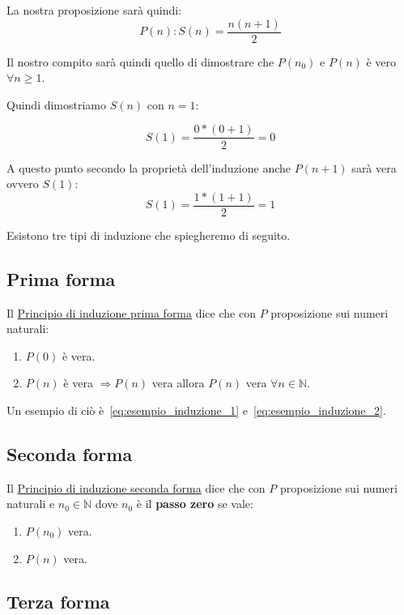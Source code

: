 \documentclass{article}
\begin{document}
La nostra proposizione sarà quindi:
\begin{equation*}
        P(n) : S(n) = \frac{n(n+1)}{2}
\end{equation*}

Il nostro compito sarà quindi quello di dimostrare che $P(n_0)$ e $P(n)$ è vero $\forall n \ge 1$. \par
Quindi dimostriamo $S(n)$ con $n = 1$:

\begin{equation}\label{eq:esempio_induzione_1}
        S(1) = \frac{0*(0+1)}{2} = 0
\end{equation}

A questo punto secondo la proprietà dell'induzione anche $P(n+1)$ sarà vera ovvero $S(1)$:
\begin{equation}\label{eq:esempio_induzione_2}
        S(1) = \frac{1*(1+1)}{2} = 1
\end{equation}

Esistono tre tipi di induzione che spiegheremo di seguito.


\subsection{Prima forma}
Il \underline{Principio di induzione prima forma} dice che con $P$ proposizione sui numeri naturali:
\begin{enumerate}
        \item $P(0)$ è vera. 
        \item $P(n)$ è vera $\Rightarrow P(n)$ vera allora $P(n)$ vera $\forall n \in \mathbb{N}$. 
\end{enumerate}
Un esempio di ciò è~\ref{eq:esempio_induzione_1} e~\ref{eq:esempio_induzione_2}.


\subsection{Seconda forma}
Il \underline{Principio di induzione seconda forma} dice che con $P$ proposizione sui numeri naturali e $n_0 \in \mathbb{N}$ dove $n_0$ è il \textbf{passo zero} se vale:
\begin{enumerate}
        \item $P(n_0)$ vera.
        \item $P(n)$ vera.
\end{enumerate}

\subsection{Terza forma}
\end{document}
